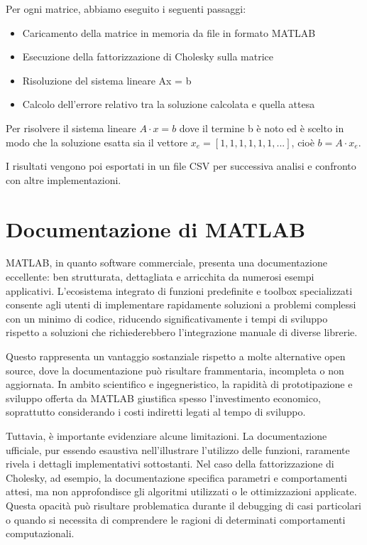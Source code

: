 Per ogni matrice, abbiamo eseguito i seguenti passaggi:

\begin{itemize}
    \item Caricamento della matrice in memoria da file in formato MATLAB
    \item Esecuzione della fattorizzazione di Cholesky sulla matrice
    \item Risoluzione del sistema lineare Ax = b
    \item Calcolo dell'errore relativo tra la soluzione calcolata e quella attesa
\end{itemize}

Per risolvere il sistema lineare $A \cdot x = b$ dove il termine b è noto ed è scelto in modo che la soluzione esatta
sia il vettore $x_e = [1, 1, 1, 1, 1, 1, ...]$, cioè $b = A \cdot x_e$.

I risultati vengono poi esportati in un file CSV per successiva analisi e confronto con altre implementazioni.

\section{Documentazione di MATLAB}

MATLAB, in quanto software commerciale, presenta una documentazione eccellente: ben strutturata, dettagliata e arricchita da numerosi 
esempi applicativi. L'ecosistema integrato di funzioni predefinite e toolbox specializzati consente agli utenti di implementare 
rapidamente soluzioni a problemi complessi con un minimo di codice, riducendo significativamente i tempi di sviluppo rispetto a 
soluzioni che richiederebbero l'integrazione manuale di diverse librerie.

Questo rappresenta un vantaggio sostanziale rispetto a molte alternative open source, dove la documentazione può risultare frammentaria, 
incompleta o non aggiornata. In ambito scientifico e ingegneristico, la rapidità di prototipazione e sviluppo offerta da MATLAB giustifica 
spesso l'investimento economico, soprattutto considerando i costi indiretti legati al tempo di sviluppo.

Tuttavia, è importante evidenziare alcune limitazioni. La documentazione ufficiale, pur essendo esaustiva nell'illustrare l'utilizzo delle 
funzioni, raramente rivela i dettagli implementativi sottostanti. Nel caso della fattorizzazione di Cholesky, ad esempio, 
la documentazione specifica parametri e comportamenti attesi, ma non approfondisce gli algoritmi utilizzati o le ottimizzazioni applicate. 
Questa opacità può risultare problematica durante il debugging di casi particolari o quando si necessita di comprendere le ragioni di 
determinati comportamenti computazionali.

